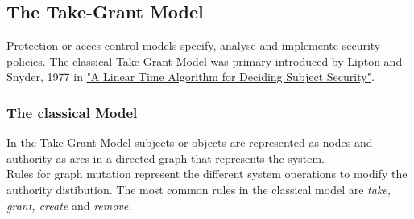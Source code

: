 \subsection{The Take-Grant Model}	
Protection or acces control models specify, analyse and implemente security policies. 
The classical Take-Grant Model was primary introduced by Lipton and Snyder, 1977 in  \href{https://www.cs.nmt.edu/~doshin/t/s06/cs589/pub/2.JLS-TG.pdf}{%
"A Linear Time Algorithm for Deciding Subject Security"}.
\subsubsection{The classical Model}
In the Take-Grant Model \cite{TakeG} subjects or objects are represented as nodes and authority as arcs in a directed graph that represents the system. \\ 
Rules for graph mutation represent the different system operations to modify  the authority distibution. 
The most common rules in the classical model are \textit{take, grant, create} and \textit{remove}. 
	
